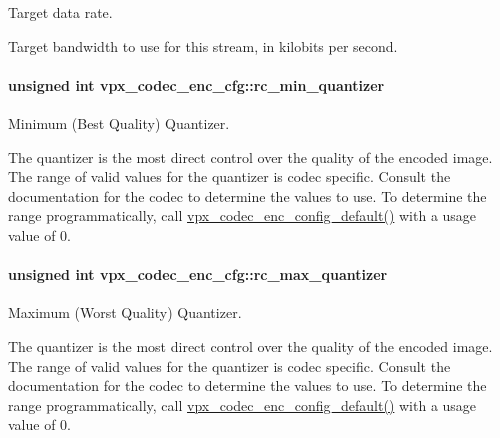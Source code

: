 Target data rate. 

Target bandwidth to use for this stream, in kilobits per second. 
\paragraph[{\texorpdfstring{rc\+\_\+min\+\_\+quantizer}{rc_min_quantizer}}]{\setlength{\rightskip}{0pt plus 5cm}unsigned int vpx\+\_\+codec\+\_\+enc\+\_\+cfg\+::rc\+\_\+min\+\_\+quantizer}\hypertarget{structvpx__codec__enc__cfg_a1324600e3c63faaa7717e85cf6509dd9}{}\label{structvpx__codec__enc__cfg_a1324600e3c63faaa7717e85cf6509dd9}


Minimum (Best Quality) Quantizer. 

The quantizer is the most direct control over the quality of the encoded image. The range of valid values for the quantizer is codec specific. Consult the documentation for the codec to determine the values to use. To determine the range programmatically, call \hyperlink{group__encoder_ga6cf8d0bbb663cd4df3a78d9eeb3bfb0e}{vpx\+\_\+codec\+\_\+enc\+\_\+config\+\_\+default()} with a usage value of 0. 
\paragraph[{\texorpdfstring{rc\+\_\+max\+\_\+quantizer}{rc_max_quantizer}}]{\setlength{\rightskip}{0pt plus 5cm}unsigned int vpx\+\_\+codec\+\_\+enc\+\_\+cfg\+::rc\+\_\+max\+\_\+quantizer}\hypertarget{structvpx__codec__enc__cfg_a8abdd985d317b720e142335887d737df}{}\label{structvpx__codec__enc__cfg_a8abdd985d317b720e142335887d737df}


Maximum (Worst Quality) Quantizer. 

The quantizer is the most direct control over the quality of the encoded image. The range of valid values for the quantizer is codec specific. Consult the documentation for the codec to determine the values to use. To determine the range programmatically, call \hyperlink{group__encoder_ga6cf8d0bbb663cd4df3a78d9eeb3bfb0e}{vpx\+\_\+codec\+\_\+enc\+\_\+config\+\_\+default()} with a usage value of 0. 
